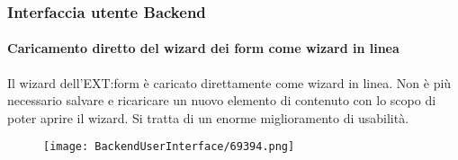 \begin{frame}[fragile]
	\frametitle{Interfaccia utente Backend}
	\framesubtitle{Caricamento diretto del wizard dei form come wizard in linea}

	Il wizard dell'EXT:form è caricato direttamente come wizard in linea.
	Non è più necessario salvare e ricaricare un nuovo elemento di contenuto con
	lo scopo di poter aprire il wizard. Si tratta di un enorme miglioramento di usabilità.

	\begin{figure}
		\texttt{[image: BackendUserInterface/69394.png]}
	\end{figure}

\end{frame}

